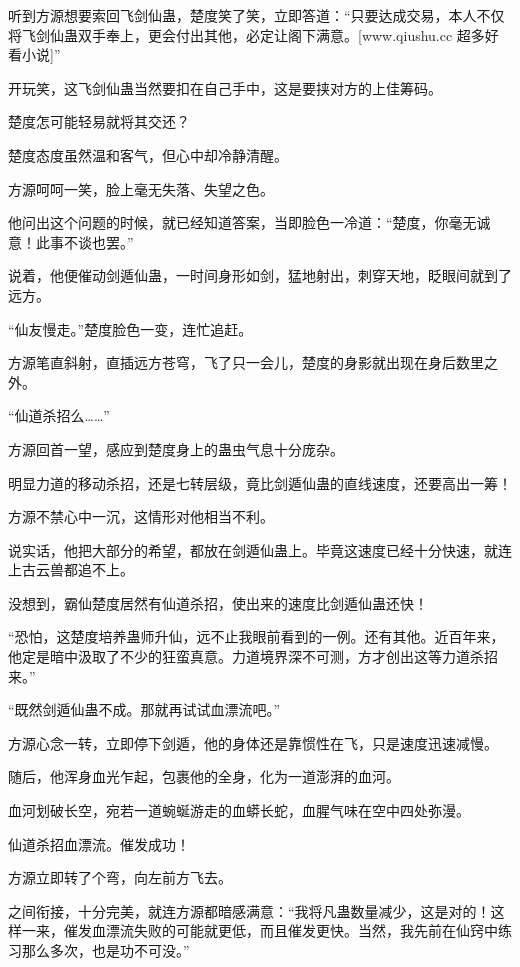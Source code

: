 
\begin{this_body}

听到方源想要索回飞剑仙蛊，楚度笑了笑，立即答道：“只要达成交易，本人不仅将飞剑仙蛊双手奉上，更会付出其他，必定让阁下满意。[www.qiushu.cc 超多好看小说]”

开玩笑，这飞剑仙蛊当然要扣在自己手中，这是要挟对方的上佳筹码。

楚度怎可能轻易就将其交还？

楚度态度虽然温和客气，但心中却冷静清醒。

方源呵呵一笑，脸上毫无失落、失望之色。

他问出这个问题的时候，就已经知道答案，当即脸色一冷道：“楚度，你毫无诚意！此事不谈也罢。”

说着，他便催动剑遁仙蛊，一时间身形如剑，猛地射出，刺穿天地，眨眼间就到了远方。

“仙友慢走。”楚度脸色一变，连忙追赶。

方源笔直斜射，直插远方苍穹，飞了只一会儿，楚度的身影就出现在身后数里之外。

“仙道杀招么……”

方源回首一望，感应到楚度身上的蛊虫气息十分庞杂。

明显力道的移动杀招，还是七转层级，竟比剑遁仙蛊的直线速度，还要高出一筹！

方源不禁心中一沉，这情形对他相当不利。

说实话，他把大部分的希望，都放在剑遁仙蛊上。毕竟这速度已经十分快速，就连上古云兽都追不上。

没想到，霸仙楚度居然有仙道杀招，使出来的速度比剑遁仙蛊还快！

“恐怕，这楚度培养蛊师升仙，远不止我眼前看到的一例。还有其他。近百年来，他定是暗中汲取了不少的狂蛮真意。力道境界深不可测，方才创出这等力道杀招来。”

“既然剑遁仙蛊不成。那就再试试血漂流吧。”

方源心念一转，立即停下剑遁，他的身体还是靠惯性在飞，只是速度迅速减慢。

随后，他浑身血光乍起，包裹他的全身，化为一道澎湃的血河。

血河划破长空，宛若一道蜿蜒游走的血蟒长蛇，血腥气味在空中四处弥漫。

仙道杀招血漂流。催发成功！

方源立即转了个弯，向左前方飞去。

之间衔接，十分完美，就连方源都暗感满意：“我将凡蛊数量减少，这是对的！这样一来，催发血漂流失败的可能就更低，而且催发更快。当然，我先前在仙窍中练习那么多次，也是功不可没。”


\end{this_body}

